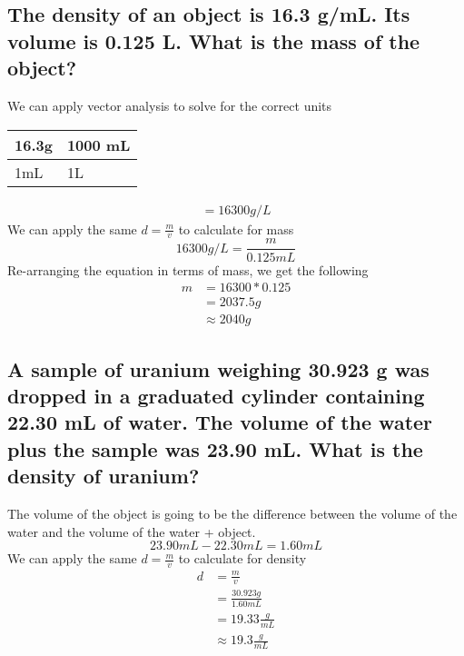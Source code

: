 \documentclass[11pt]{article}
\begin{document}
\subsection{The density of an object is 16.3 g/mL. Its volume is 0.125 L. What is the mass of the object?}
\label{sec:org99d3a1c}
We can apply vector analysis to solve for the correct units
\begin{center}
\begin{tabular}{ll}
16.3g & 1000 mL\\
\hline
1mL & 1L\\
\end{tabular}
\end{center}
\begin{align*}
=16300{g}/{L}
\end{align*}
We can apply the same \(d=\frac{m}{v}\) to calculate for mass
\begin{equation}
16300{g}/{L}=\frac{m}{0.125mL}
\end{equation}
Re-arranging the equation in terms of mass, we get the following
\begin{align*}
m &= 16300 * 0.125\\
&= 2037.5g\\
&\approx 2040g
\end{align*}

\subsection{A sample of uranium weighing 30.923 g was dropped in a graduated cylinder containing 22.30 mL of water. The volume of the water plus the sample was 23.90 mL. What is the density of uranium?}
\label{sec:orgfe9e23e}
The volume of the object is going to be the difference between the volume of the water and the volume of the water + object.
\begin{equation}
23.90mL - 22.30mL = 1.60mL
\end{equation}
We can apply the same \(d=\frac{m}{v}\) to calculate for density
\begin{align*}
d&=\frac{m}{v} \\
            &=\frac{30.923g}{1.60mL}\\
            &=19.33\frac{g}{mL}\\
            &\approx19.3\frac{g}{mL}
\end{align*}
\end{document}

